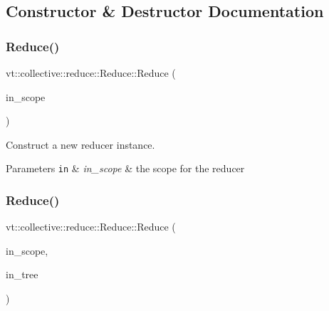 \subsection{Constructor \& Destructor Documentation}
\mbox{\label{structvt_1_1collective_1_1reduce_1_1_reduce_a5e5a3c0e00259bec5aad517aeaba36ac}} 
\subsubsection{\texorpdfstring{Reduce()}{Reduce()}\hspace{0.1cm}{\footnotesize\ttfamily [1/2]}}
{\footnotesize\ttfamily vt\+::collective\+::reduce\+::\+Reduce\+::\+Reduce (\begin{DoxyParamCaption}\item[{\hyperlink{structvt_1_1collective_1_1reduce_1_1detail_1_1_reduce_scope}{detail\+::\+Reduce\+Scope} const \&}]{in\+\_\+scope }\end{DoxyParamCaption})\hspace{0.3cm}{\ttfamily [explicit]}}



Construct a new reducer instance. 


\begin{DoxyParams}[1]{Parameters}
\mbox{\tt in}  & {\em in\+\_\+scope} & the scope for the reducer \\
\hline
\end{DoxyParams}
\mbox{\label{structvt_1_1collective_1_1reduce_1_1_reduce_a346fd6b262828a501c342330fc091fec}} 
\subsubsection{\texorpdfstring{Reduce()}{Reduce()}\hspace{0.1cm}{\footnotesize\ttfamily [2/2]}}
{\footnotesize\ttfamily vt\+::collective\+::reduce\+::\+Reduce\+::\+Reduce (\begin{DoxyParamCaption}\item[{\hyperlink{structvt_1_1collective_1_1reduce_1_1detail_1_1_reduce_scope}{detail\+::\+Reduce\+Scope} const \&}]{in\+\_\+scope,  }\item[{\hyperlink{structvt_1_1collective_1_1tree_1_1_tree}{collective\+::tree\+::\+Tree} $\ast$}]{in\+\_\+tree }\end{DoxyParamCaption})}



